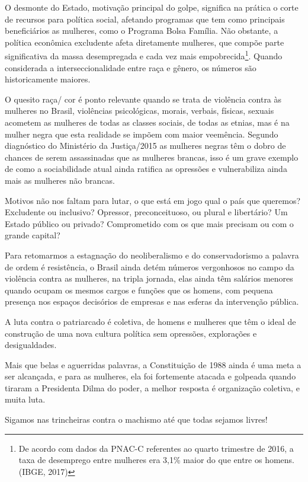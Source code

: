 O desmonte do Estado, motivação principal do golpe, significa na prática
o corte de recursos para política social, afetando programas que tem
como principais beneficiários as mulheres, como o Programa Bolsa
Família. Não obstante, a política econômica excludente afeta diretamente
mulheres, que compõe parte significativa da massa desempregada e cada
vez mais empobrecida\footnote{De acordo com dados da PNAC-C referentes
  ao quarto trimestre de 2016, a taxa de desemprego entre mulheres era
  3,1\% maior do que entre os homens. (IBGE, 2017)}. Quando considerada
a interseccionalidade entre raça e gênero, os números são historicamente
maiores.

O quesito raça/ cor é ponto relevante quando se trata de violência
contra às mulheres no Brasil, violências psicológicas, morais, verbais,
físicas, sexuais acometem as mulheres de todas as classes sociais, de
todas as etnias, mas é na mulher negra que esta realidade se impõem com
maior veemência. Segundo diagnóstico do Ministério da Justiça/2015 as
mulheres negras têm o dobro de chances de serem assassinadas que as
mulheres brancas, isso é um grave exemplo de como a sociabilidade atual
ainda ratifica as opressões e vulnerabiliza ainda mais as mulheres não
brancas.

Motivos não nos faltam para lutar, o que está em jogo qual o país que
queremos? Excludente ou inclusivo? Opressor, preconceituoso, ou plural e
libertário? Um Estado público ou privado? Comprometido com os que mais
precisam ou com o grande capital?

Para retomarmos a estagnação do neoliberalismo e do conservadorismo a
palavra de ordem é resistência, o Brasil ainda detém números vergonhosos
no campo da violência contra as mulheres, na tripla jornada, elas ainda
têm salários menores quando ocupam os mesmos cargos e funções que os
homens, com pequena presença nos espaços decisórios de empresas e nas
esferas da intervenção pública.

A luta contra o patriarcado é coletiva, de homens e mulheres que têm o
ideal de construção de uma nova cultura política sem opressões,
explorações e desigualdades.

Mais que belas e aguerridas palavras, a Constituição de 1988 ainda é uma
meta a ser alcançada, e para as mulheres, ela foi fortemente atacada e
golpeada quando tiraram a Presidenta Dilma do poder, a melhor resposta é
organização coletiva, e muita luta.

Sigamos nas trincheiras contra o machismo até que todas sejamos livres!


